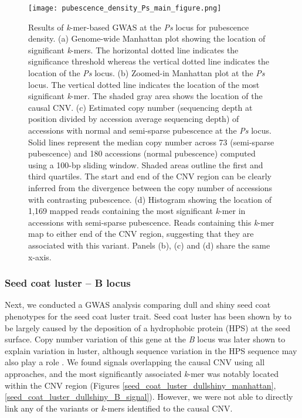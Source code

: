 \begin{figure}
	\centering
	\texttt{[image: pubescence\_density\_Ps\_main\_figure.png]}
	\caption[Results of \textit{k}-mer-based GWAS at the
	\textit{Ps} locus for pubescence density.]{Results of \textit{k}-mer-based GWAS at the
	\textit{Ps} locus for pubescence density.
	(a) Genome-wide Manhattan plot showing the location of significant \textit{k}-mers. The
	horizontal dotted line indicates the significance threshold whereas the
	vertical dotted line indicates the location of the \textit{Ps} locus.
	(b) Zoomed-in Manhattan plot at the \textit{Ps} locus. The
	vertical dotted line indicates the location of the most significant
	\textit{k}-mer. The shaded gray area shows the location of the causal CNV.
	(c) Estimated copy number (sequencing depth at position divided by
	accession average sequencing depth) of accessions with normal and
	semi-sparse pubescence at the \textit{Ps} locus. Solid lines represent
	the median copy number across 73 (semi-sparse pubescence) and 180
	accessions (normal pubescence) computed using a 100-bp sliding window.
	Shaded areas outline the first and third quartiles. The start and end
	of the CNV region can be clearly inferred from the divergence between
	the copy number of accessions with contrasting pubescence.
	(d) Histogram showing the location of 1,169 mapped reads containing the
	most significant \textit{k}-mer in accessions with semi-sparse pubescence.
	Reads containing this \textit{k}-mer map to either end of the CNV
	region, suggesting that they are associated with this variant. Panels
	(b), (c) and (d) share the same x-axis.}
	\label{pubescence-density-main-figure}
\end{figure}

\subsubsection*{Seed coat luster -- B locus}
\label{sv-gwas-main-results-seed-coat-luster-b}

Next, we conducted a GWAS analysis comparing dull and shiny seed coat phenotypes
for the seed coat luster trait. Seed coat luster has been shown by \cite{gijzen1999}
to be largely caused by the deposition of a hydrophobic protein (HPS)
at the seed surface. Copy number variation of this gene at the \textit{B}
locus was later shown to explain variation in luster, although sequence
variation in the HPS sequence may also play a role \citep{gijzen2006}.
We found signals overlapping the causal CNV using all approaches, and the
most significantly associated \textit{k}-mer was notably located
within the CNV region (Figures \ref{seed_coat_luster_dullshiny_manhattan},
\ref{seed_coat_luster_dullshiny_B_signal}). However, we were not able
to directly link any of the variants or \textit{k}-mers identified to the causal
CNV.

